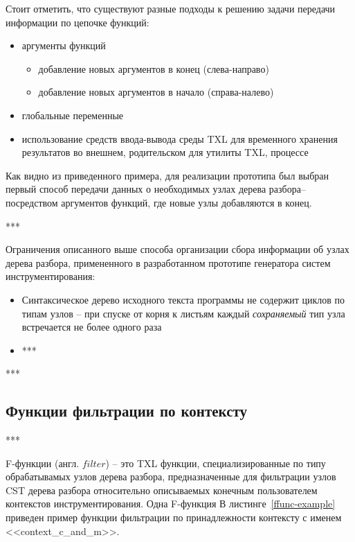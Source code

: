 Стоит отметить, что существуют разные подходы к решению задачи передачи информации по цепочке функций:
\begin {itemize}[noitemsep]
  \item аргументы функций
    \begin{itemize}[noitemsep]
      \item добавление новых аргументов в конец (слева-направо)
      \item добавление новых аргументов в начало (справа-налево)
    \end{itemize}
  \item глобальные переменные
  \item использование средств ввода-вывода среды TXL для временного хранения результатов во внешнем, родительском для утилиты TXL, процессе
\end{itemize}

Как видно из приведенного примера, для реализации прототипа был выбран первый способ передачи данных о необходимых узлах дерева разбора-- посредством аргументов функций, где новые узлы добавляются в конец.

***

Ограничения описанного выше способа организации сбора информации об узлах дерева разбора, примененного в разработанном прототипе генератора систем инструментирования:
\begin{itemize}[noitemsep]
  \item Синтаксическое дерево исходного текста программы не содержит циклов по типам узлов -- при спуске от корня к листьям каждый \textit{сохраняемый} тип узла встречается не более одного раза
  \item ***
\end{itemize}

***

\subsection{Функции фильтрации по контексту}

***

F-функции (англ. $filter$) -- это TXL функции, специализированные по типу обрабатывамых узлов дерева разбора, предназначенные для фильтрации узлов CST дерева разбора относительно описываемых конечным пользователем контекстов инструментирования.
Одна F-функция 
В листинге~\ref{ffunc-example} приведен пример функции фильтрации по принадлежности контексту с именем <<context\_c\_and\_m>>.

